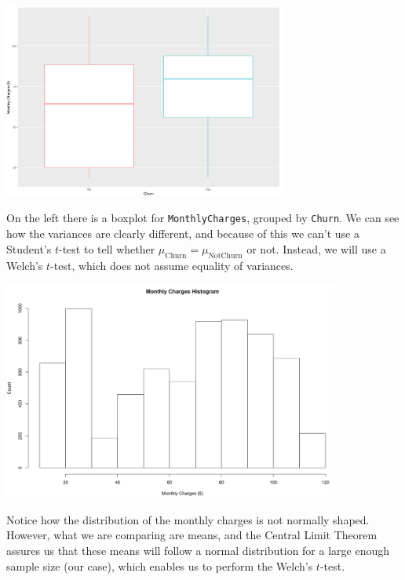 \documentclass[man, floatsintext]{apa6}
\begin{document}

\noindent\begin{minipage}{0.54\textwidth}
\includegraphics[width = \linewidth, height = 64mm]{boxplot_MonthlyChargesvsChurn}
\end{minipage}
\hfill
\begin{minipage}{0.43\textwidth} On the left there is a boxplot for \texttt{MonthlyCharges}, grouped by \texttt{Churn}. We can see how the variances are clearly different, and because of this we can't use a Student's $t$-test to tell whether $\mu_{\text{Churn}} = \mu_{\text{NotChurn}}$ or not. Instead, we will use a Welch's $t$-test, which does not assume equality of variances.
\end{minipage}


\noindent\begin{minipage}{0.54\textwidth}
\includegraphics[width = \linewidth, height = 72mm]{hist_MonthlyCharges}
\end{minipage}
\hfill
\begin{minipage}{0.43\textwidth} Notice how the distribution of the monthly charges is not normally shaped. However, what we are comparing are means, and the Central Limit Theorem assures us that these means will follow a normal distribution for a large enough sample size (our case), which enables us to perform the Welch's $t$-test.
\end{minipage}
\end{document}
